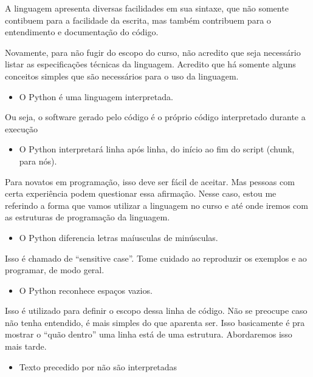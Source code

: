 \documentclass[letterpaper,10pt,english]{jupyterBook}
\begin{document}
\sphinxAtStartPar
A linguagem apresenta diversas facilidades em sua sintaxe, que não somente contibuem para a facilidade da escrita, mas também contribuem para o entendimento e documentação do código.

\sphinxAtStartPar
Novamente, para não fugir do escopo do curso, não acredito que seja necessário listar as especificações técnicas da linguagem. Acredito que há somente alguns conceitos simples que são necessários para o uso da linguagem.
\begin{itemize}
\item {} 
\sphinxAtStartPar
O Python é uma linguagem interpretada.

\end{itemize}

\sphinxAtStartPar
Ou seja, o software gerado pelo código é o próprio código interpretado durante a execução
\begin{itemize}
\item {} 
\sphinxAtStartPar
O Python interpretará linha após linha, do início ao fim do script (chunk, para nós).

\end{itemize}

\sphinxAtStartPar
Para novatos em programação, isso deve ser fácil de aceitar. Mas pessoas com certa experiência podem questionar essa afirmação. Nesse caso, estou me referindo a forma que vamos utilizar a linguagem no curso e até onde iremos com as estruturas de programação da linguagem.
\begin{itemize}
\item {} 
\sphinxAtStartPar
O Python diferencia letras maíusculas de minúsculas.

\end{itemize}

\sphinxAtStartPar
Isso é chamado de “sensitive case”. Tome cuidado ao reproduzir os exemplos e ao programar, de modo geral.
\begin{itemize}
\item {} 
\sphinxAtStartPar
O Python reconhece espaços vazios.

\end{itemize}

\sphinxAtStartPar
Isso é utilizado para definir o escopo dessa linha de código. Não se preocupe caso não tenha entendido, é mais simples do que aparenta ser. Isso basicamente é pra mostrar o “quão dentro” uma linha está de uma estrutura. Abordaremos isso mais tarde.
\begin{itemize}
\item {} 
\sphinxAtStartPar
Texto precedido por \sphinxcode{\sphinxupquote{\#}} não são interpretadas

\end{itemize}
\end{document}
